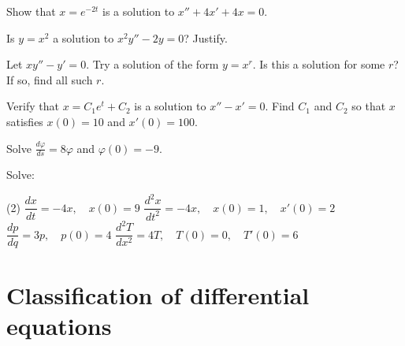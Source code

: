 \begin{exercise}
	Show that $x = e^{-2t}$ is a solution to $x'' + 4x' + 4x = 0$.
\end{exercise}

\begin{exercise}
	Is $y = x^2$ a solution to $x^2y'' - 2y = 0$?  Justify.
\end{exercise}

\begin{exercise}
	Let $xy'' - y' = 0$.  Try a solution of the form $y = x^r$.  Is this a
	solution for some $r$?  If so, find all such $r$.
\end{exercise}


\begin{exercise}
	Verify that $x=C_1e^t+C_2$ is a solution to $x''-x' = 0$.  Find $C_1$ and
	$C_2$ so that $x$ satisfies $x(0) = 10$ and $x'(0) = 100$.
\end{exercise}

\begin{exercise}
	Solve $\frac{d\varphi}{ds} = 8 \varphi$ and $\varphi(0) = -9$.
\end{exercise}

\begin{exercise}
	Solve:
	\begin{tasks}(2)
		\task $\dfrac{dx}{dt} = -4x, \quad x(0)=9$
		\task $\dfrac{d^2x}{dt^2} = -4x, \quad x(0)=1, \quad x'(0)=2$
		\task $\dfrac{dp}{dq} = 3 p, \quad p(0)=4$
		\task $\dfrac{d^2T}{dx^2} = 4 T, \quad T(0)=0, \quad T'(0)=6$
	\end{tasks}
\end{exercise}


\sectionnewpage
\section{Classification of differential equations}
\label{classification:section}

